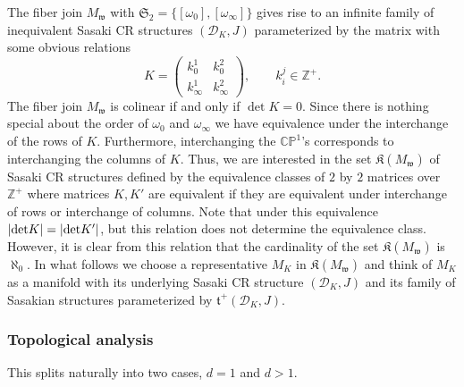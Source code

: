 \documentclass[12pt]{amsart}
\def\bbc{{\mathbb C}}
\def\bbp{{\mathbb P}}
\def\bbz{{\mathbb Z}}
\def\gro{\omega}
\def\cald{{\mathcal D}}
\def\gt{{\mathfrak t}}
\def\gw{{\mathfrak w}}
\def\gK{{\mathfrak K}}
\def\gS{{\mathfrak S}}
\begin{document}
The fiber join $M_\gw$ with $\gS_2=\{[\gro_0],[\gro_\infty]\}$ gives rise to an infinite family of inequivalent Sasaki CR structures $(\cald_K,J)$ parameterized by the matrix with some obvious relations
\begin{equation}\label{22matrix}
K= \begin{pmatrix}
     k^1_0 & k^2_0 \\
k^1_{\infty} & k^2_{\infty}
\end{pmatrix}, \qquad k^j_i\in \bbz^+.
\end{equation}
The fiber join $M_\gw$ is colinear if and only if  $\det K=0$.
Since there is nothing special about the order of $\gro_0$ and $\gro_\infty$ we have equivalence under the interchange of the rows of $K$. Furthermore, interchanging the $\bbc\bbp^1$'s corresponds to interchanging the columns of $K$. Thus, we are interested in the set $\gK(M_\gw)$ of Sasaki CR structures defined by the equivalence classes of $2$ by $2$ matrices over $\bbz^+$ where matrices $K,K'$ are equivalent if they are equivalent under interchange of rows or interchange of columns. Note that under this equivalence $|{\rm det} K|=|{\rm det} K'|$, but this relation does not determine the equivalence class. However, it is clear from this relation that the cardinality of the set $\gK(M_\gw)$ is $\aleph_0$. In what follows we choose a representative $M_K$ in $\gK(M_\gw)$ and think of $M_K$  as a manifold with its underlying Sasaki CR structure $(\cald_K,J)$ and its family of Sasakian structures parameterized by $\gt^+(\cald_K,J)$.
 

\subsubsection{Topological analysis}
This splits naturally into two cases, $d=1$ and $d>1$. 
\end{document}
